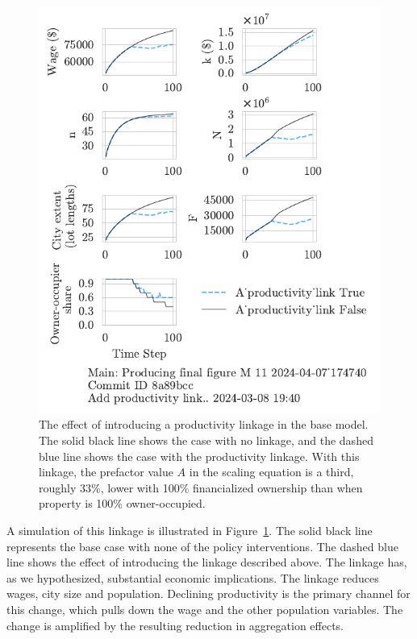 \begin{figure}[h!tb] 
\centering
\includegraphics[scale=1, trim={0 1.4cm .0cm 0},clip]{fig/productivity_link_174740.pdf} 
\caption[The effect of introducing a productivity linkage in the base model]{The effect of introducing a productivity linkage in the base model. The solid black line shows the case with no linkage, and the dashed blue line shows the case with the productivity linkage. With this linkage, the prefactor value $A$ in the scaling equation is a third, roughly 33\%, lower with 100\% financialized ownership than when property is 100\% owner-occupied. }
\label{fig-impact-channel-example}
\end{figure}

A simulation of this linkage is illustrated in Figure~\ref{fig-impact-channel-example}. The solid black line represents the base case with none of the policy interventions. The dashed blue line shows the effect of introducing the linkage described above. 
The linkage has, as we hypothesized, substantial economic implications. The linkage reduces wages, city size and population.  Declining productivity is the primary channel for this change, which pulls down the wage and the other population variables. The change is amplified by the resulting reduction in aggregation effects. 

